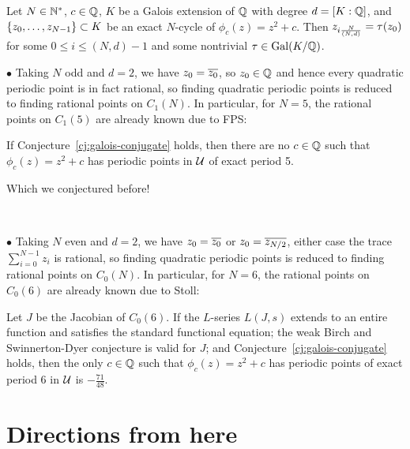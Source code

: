 \documentclass[aspectratio=1610]{beamer}
\begin{document}
\begin{frame}
  \begin{hconjecture}
    \label{cj:galois-conjugate}
    Let $N \in \mathbb{N}^*$, $c \in \mathbb{Q}$, $K$ be a Galois extension of $\mathbb{Q}$
    with degree $d = [K : \mathbb{Q}]$, and $\left\{z_0, \dots, z_{N-1}\right\} \subset
    K$ be an exact $N$-cycle of $\phi_c(z) = z^2 + c$. Then $z_{i\frac{N}{(N, d)}}
    = \tau(z_0)$ for some $0 \le i \le (N, d)-1$ and some nontrivial $\tau
    \in \mathrm{Gal}(K/\mathbb{Q})$.
  \end{hconjecture}

  \pause

  $\bullet$ Taking $N$ odd and $d = 2$, we have $z_0 = \overline{z_0}$, so
  $z_0 \in \mathbb{Q}$ and hence every quadratic periodic point is in fact
  rational, so finding quadratic periodic points is reduced to finding
  rational points on $C_1(N)$. In particular, for $N = 5$, the
  rational points on $C_1(5)$ are already known due to FPS:

  \begin{hcorollary}
    If Conjecture~\ref{cj:galois-conjugate} holds, then there are no
    $c \in \mathbb{Q}$ such that $\phi_c(z) = z^2 + c$ has periodic points in
    $\mathcal{U}$ of exact period 5.
  \end{hcorollary}

  Which we conjectured before!

  \pause\

  $\bullet$ Taking $N$ even and $d = 2$, we have $z_0 = \overline{z_0}$ or
  $z_0 = \overline{z_{N/2}}$, either case the trace $\sum_{i=0}^{N-1}z_i$
  is rational, so finding quadratic periodic points is reduced to
  finding rational points on $C_0(N)$. In particular, for $N = 6$, the
  rational points on $C_0(6)$ are already known due to Stoll:

  \begin{hcorollary}
    \label{cor:6-cycle}
    Let $J$ be the Jacobian of $C_0(6)$. If the $L$-series $L(J, s)$
    extends to an entire function and satisfies the standard
    functional equation; the weak Birch and Swinnerton-Dyer conjecture
    is valid for $J$; and Conjecture~\ref{cj:galois-conjugate} holds,
    then the only $c \in \mathbb{Q}$ such that $\phi_c(z) = z^2 + c$ has
    periodic points of exact period 6 in $\mathcal{U}$ is $-\frac{71}{48}$.
  \end{hcorollary}
\end{frame}

\section{Directions from here}
\end{document}
